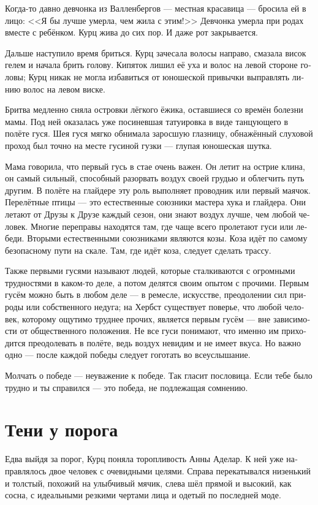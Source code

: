 \documentclass[a4paper,12pt,fleqn]{book}\usepackage{cooltooltips}\usepackage{polyglossia}\setdefaultlanguage[babelshorthands=true]{russian}\setotherlanguage{english}\defaultfontfeatures{Ligatures=TeX,Mapping=tex-text} \usepackage{xcolor}\definecolor{lightgray}{HTML}{bbbbbb}\color{lightgray}\newcommand{\ml}[3]{\textenglish{\textcolor{black}{#3}}}
\begin{document}
Когда-то давно девчонка из Валленбергов --- местная красавица --- бросила ей в лицо:
<<Я бы лучше умерла, чем жила с этим!>>
Девчонка умерла при родах вместе с ребёнком.
Курц жива до сих пор.
И даже рот закрывается.

Дальше наступило время бриться.
Курц зачесала волосы направо, смазала висок гелем и начала брить голову.
Кипяток лишил её уха и волос на левой стороне головы;
Курц никак не могла избавиться от юношеской привычки выправлять линию волос на левом виске.

Бритва медленно сняла островки лёгкого ёжика, оставшиеся со времён болезни мамы.
Под ней оказалась уже посиневшая татуировка в виде танцующего в полёте гуся.
Шея гуся мягко обнимала заросшую глазницу, обнажённый слуховой проход был точно на месте гусиной гузки --- глупая юношеская шутка.

Мама говорила, что первый гусь в стае очень важен.
Он летит на острие клина, он самый сильный, способный разорвать воздух своей грудью и облегчить путь другим.
В полёте на глайдере эту роль выполняет проводник или первый маячок.
Перелётные птицы --- это естественные союзники мастера хука и глайдера.
Они летают от Друзы к Друзе каждый сезон, они знают воздух лучше, чем любой человек.
Многие переправы находятся там, где чаще всего пролетают гуси или лебеди.
Вторыми естественными союзниками являются козы.
Коза идёт по самому безопасному пути на скале.
Там, где идёт коза, следует сделать трассу.

Также первыми гусями называют людей, которые сталкиваются с огромными трудностями в каком-то деле, а потом делятся своим опытом с прочими.
Первым гусём можно быть в любом деле --- в ремесле, искусстве, преодолении сил природы или собственного недуга;
на Хербст существует поверье, что любой человек, которому ощутимо труднее прочих, является первым гусём --- вне зависимости от общественного положения.
Не все гуси понимают, что именно им приходится преодолевать в полёте, ведь воздух невидим и не имеет вкуса.
Но важно одно --- после каждой победы следует гоготать во всеуслышание.

Молчать о победе --- неуважение к победе.
Так гласит пословица.
Если тебе было трудно и ты справился --- это победа, не подлежащая сомнению.

\section{Тени у порога}

Едва выйдя за порог, Курц поняла торопливость Анны Аделар.
К ней уже направлялось двое человек с очевидными целями.
Справа перекатывался низенький и толстый, похожий на улыбчивый мячик, слева шёл прямой и высокий, как сосна, с идеальными резкими чертами лица и одетый по последней моде.
\end{document}
